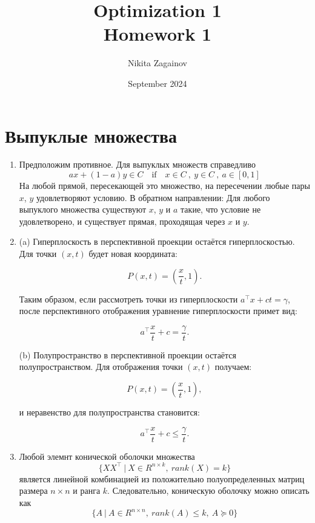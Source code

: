 \documentclass{article}
\title{Optimization 1 \\ Homework 1}
\author{Nikita Zagainov}
\date{September 2024}
\begin{document}
\maketitle

\section{Выпуклые множества}
\begin{enumerate}
    \item Предположим противное. Для выпуклых множеств справедливо
          \[
              ax + (1-a)y \in C \quad \text{if} \quad x \in C \ , \ y \in C \ , \ a \in [0, 1]
          \]
          На любой прямой, пересекающей это множество, на пересечении любые пары $x$, $y$ удовлетворяют условию. В обратном направлении: Для любого выпуклого множества существуют $x$, $y$ и $a$ такие, что условие не удовлетворено, и существует прямая, проходящая через $x$ и $y$.

    \item
          (a) Гиперплоскость в перспективной проекции остаётся гиперплоскостью. Для точки \( (x, t) \) будет новая координата:

          \[
              P(x, t) = \left(\frac{x}{t}, 1\right).
              \label{Helo}
          \]

          Таким образом, если рассмотреть точки из гиперплоскости \( a^\top x + ct = \gamma \), после перспективного отображения уравнение гиперплоскости примет вид:

          \[
              a^\top \frac{x}{t} + c = \frac{\gamma}{t}.
          \]

          (b) Полупространство в перспективной проекции остаётся полупространством. Для отображения точки \( (x, t) \) получаем:

          \[
              P(x, t) = \left(\frac{x}{t}, 1\right),
          \]

          и неравенство для полупространства становится:

          \[
              a^\top \frac{x}{t} + c \leq \frac{\gamma}{t}.
          \]

    \item Любой элемнт конической оболочки множества
          \[
              \{XX^\top \ | \ X \in R^{n \times k}, \ rank(X) = k\}
          \]
          является линейной комбинацией из положительно полуопределенных матриц размера $n \times n$ и ранга $k$. Следовательно, коническую оболочку можно описать как
          \[
              \{A \ | \ A \in R^{n \times n}, \ rank(A) \leq k, \ A \succeq 0\}
          \]


\end{enumerate}
\end{document}
